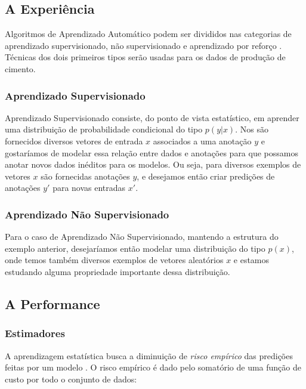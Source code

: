 \subsection{A Experiência}
\label{sec:exp}
Algoritmos de Aprendizado Automático podem ser divididos nas categorias de
aprendizado supervisionado, não supervisionado e aprendizado por reforço
\citep{dlbook}. Técnicas dos dois primeiros tipos serão usadas para os dados de
produção de cimento.


\subsubsection{Aprendizado Supervisionado}
\label{sec:apren} 
Aprendizado Supervisionado consiste, do ponto de vista estatístico, em aprender uma distribuição
de probabilidade condicional do tipo $p(y | x)$. Nos são fornecidos diversos vetores de
entrada $x$ associados a uma anotação $y$ e gostaríamos de modelar essa relação
entre dados e anotações para que possamos anotar novos dados inéditos para os
modelos. Ou seja, para diversos exemplos de vetores
$x$ são fornecidas anotações $y$, e desejamos então criar predições de anotações
$y'$ para novas entradas $x'$.


\subsubsection{Aprendizado Não Supervisionado}

Para o caso de Aprendizado Não Supervisionado, mantendo a estrutura do exemplo
anterior, desejaríamos então modelar uma distribuição do tipo $p(x)$, onde temos
também diversos exemplos de vetores aleatórios $x$ e estamos estudando alguma propriedade importante dessa distribuição.



\subsection{A Performance}
\label{sec:metricas}

\subsubsection{Estimadores}
\label{sec:est}

A aprendizagem estatística busca a diminuição de \textit{risco empírico} das predições feitas por
um modelo \citep{mlprob}. O risco empírico é dado pelo somatório de uma função
de custo por todo o conjunto de dados:

